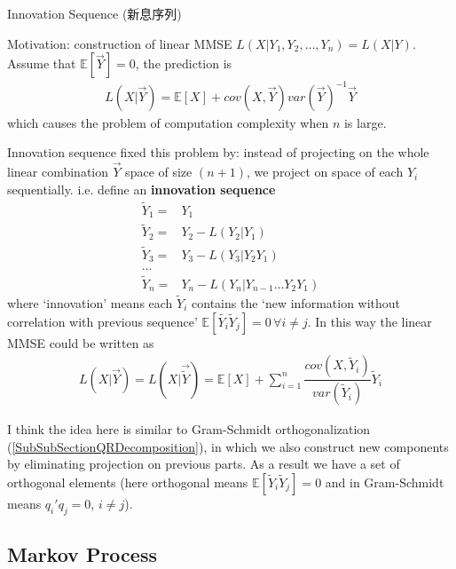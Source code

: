 \begin{point}
    Innovation Sequence (新息序列)
\end{point}

Motivation: construction of linear MMSE $ L(X|Y_1,Y_2,\ldots,Y_n)=L(X|Y) $. Assume that $\mathbb{E}\left[ \vec{Y} \right] =0 $, the prediction is
\begin{align}
    L(X|\vec{Y})=\mathbb{E}\left[ X \right] + cov(X,\vec{Y})var(\vec{Y})^{-1}\vec{Y}
\end{align}
which causes the problem of computation complexity when $ n $ is large. 

Innovation sequence fixed this problem by: instead of projecting on the whole linear combination $ \vec{Y} $ space of size $ (n+1) $, we project on space of each $ Y_i $ sequentially. i.e. define an \textbf{innovation sequence} 
\begin{align}
    \tilde{Y}_1=&Y_1\\
    \tilde{Y}_2=&Y_2-L(Y_2|Y_1)\\
    \tilde{Y}_3=&Y_3-L(Y_3|Y_2Y_1)\\
    \ldots&\\
    \tilde{Y}_n=&Y_n-L(Y_n|Y_{n-1}\ldots Y_2Y_1)
\end{align}
where `innovation' means each $ \tilde{Y}_i $ contains the `new information without correlation with previous sequence' $ \mathbb{E}\left[ \tilde{Y_i}\tilde{Y}_j \right]=0\,\forall i\neq j  $. In this way the linear MMSE could be written as
\begin{align}
    L(X|\vec{Y})=L(X|\vec{\tilde{Y}})= \mathbb{E}\left[ X \right] +\sum_{i=1}^n \dfrac{cov(X,\tilde{Y}_i)}{var(\tilde{Y}_i)}\tilde{Y}_i
\end{align}

I think the idea here is similar to Gram-Schmidt orthogonalization (\autoref{SubSubSectionQRDecomposition}), in which we also construct new components by eliminating projection on previous parts. As a result we have a set of orthogonal elements (here orthogonal means $ \mathbb{E}\left[ \tilde{Y}_i\tilde{Y}_j \right]=0  $ and in Gram-Schmidt means $ q_i'q_j = 0 $, $ i\neq j $).






\subsection{Markov Process}

